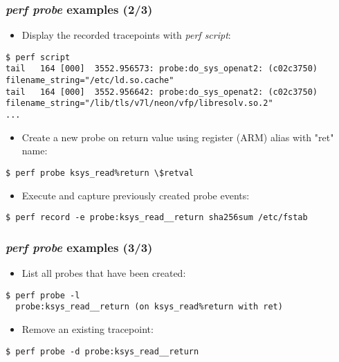 \begin{frame}[fragile]
  \frametitle{{\em perf probe} examples (2/3)}

  \begin{itemize}
    \item Display the recorded tracepoints with {\em perf script}:
  \end{itemize}
  \begin{block}{}
    \begin{verbatim}
$ perf script
tail   164 [000]  3552.956573: probe:do_sys_openat2: (c02c3750) filename_string="/etc/ld.so.cache"
tail   164 [000]  3552.956642: probe:do_sys_openat2: (c02c3750) filename_string="/lib/tls/v7l/neon/vfp/libresolv.so.2"
...
    \end{verbatim}
  \end{block}
  \begin{itemize}
    \item Create a new probe on  return value using register
           (ARM) alias with "ret" name:
  \end{itemize}
  \begin{block}{}
    \begin{verbatim}
$ perf probe ksys_read%return \$retval
    \end{verbatim}
  \end{block}
  \begin{itemize}
    \item Execute  and capture previously created probe events:
  \end{itemize}
  \begin{block}{}
    \begin{verbatim}
$ perf record -e probe:ksys_read__return sha256sum /etc/fstab
    \end{verbatim}
  \end{block}
\end{frame}

\begin{frame}[fragile]
  \frametitle{{\em perf probe} examples (3/3)}

  \begin{itemize}
    \item List all probes that have been created:
  \end{itemize}
  \begin{block}{}
    \begin{verbatim}
$ perf probe -l
  probe:ksys_read__return (on ksys_read%return with ret)
    \end{verbatim}
  \end{block}
  \begin{itemize}
    \item Remove an existing tracepoint:
  \end{itemize}
  \begin{block}{}
    \begin{verbatim}
$ perf probe -d probe:ksys_read__return
    \end{verbatim}
  \end{block}
\end{frame}

